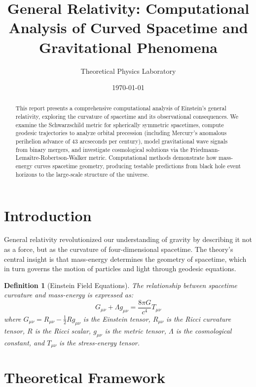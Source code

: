 \documentclass[a4paper, 11pt]{article}
\title{General Relativity: Computational Analysis of Curved Spacetime and Gravitational Phenomena}
\author{Theoretical Physics Laboratory}
\date{\today}
\newtheorem{definition}{Definition}[section]
\begin{document}
\maketitle

\begin{abstract}
This report presents a comprehensive computational analysis of Einstein's general relativity,
exploring the curvature of spacetime and its observational consequences. We examine the
Schwarzschild metric for spherically symmetric spacetimes, compute geodesic trajectories
to analyze orbital precession (including Mercury's anomalous perihelion advance of 43
arcseconds per century), model gravitational wave signals from binary mergers, and
investigate cosmological solutions via the Friedmann-Lema\^{i}tre-Robertson-Walker metric.
Computational methods demonstrate how mass-energy curves spacetime geometry, producing
testable predictions from black hole event horizons to the large-scale structure of the universe.
\end{abstract}

\section{Introduction}

General relativity revolutionized our understanding of gravity by describing it not as a force,
but as the curvature of four-dimensional spacetime. The theory's central insight is that
mass-energy determines the geometry of spacetime, which in turn governs the motion of
particles and light through geodesic equations.

\begin{definition}[Einstein Field Equations]
The relationship between spacetime curvature and mass-energy is expressed as:
\begin{equation}
G_{\mu\nu} + \Lambda g_{\mu\nu} = \frac{8\pi G}{c^4} T_{\mu\nu}
\end{equation}
where $G_{\mu\nu} = R_{\mu\nu} - \frac{1}{2}Rg_{\mu\nu}$ is the Einstein tensor, $R_{\mu\nu}$
is the Ricci curvature tensor, $R$ is the Ricci scalar, $g_{\mu\nu}$ is the metric tensor,
$\Lambda$ is the cosmological constant, and $T_{\mu\nu}$ is the stress-energy tensor.
\end{definition}

\section{Theoretical Framework}
\end{document}
